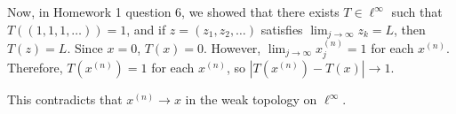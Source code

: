 \documentclass[11pt]{article}
\begin{document}
\begin{enumerate}[label=\arabic*.]
\begin{enumerate}
        Now, in Homework 1 question 6, we showed that there exists $T \in \ell^{\infty}$ such that $T((1, 1, 1, \ldots)) = 1$, and if $z = (z_1, z_2, \ldots)$ satisfies $\lim_{j \to \infty} z_k = L$, then $T(z) = L$.
        Since $x = 0$, $T(x) = 0$.
        However, $\lim_{j \to \infty}x^{(n)}_j = 1$ for each $x^{(n)}$.
        Therefore, $T(x^{(n)}) = 1$ for each $x^{(n)}$, so $|T(x^{(n)}) - T(x)| \to 1$.

        This contradicts that $x^{(n)} \to x$ in the weak topology on $\ell^{\infty}$.
\end{enumerate}

\end{enumerate}
\end{document}
